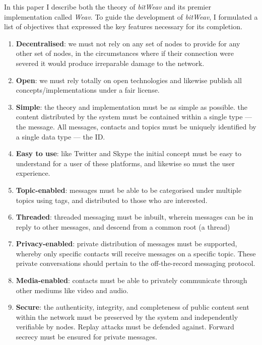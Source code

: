 \documentclass[10pt,a4paper,onecolumn]{article}
\begin{document}
In this paper I describe both the theory of \textit{bitWeav} and its premier implementation called \textit{Weav}. To guide the development of \textit{bitWeav}, I formulated a list of objectives that expressed the key features necessary for its completion.
\begin{enumerate}
\item \textbf{Decentralised}: we must not rely on any set of nodes to provide for any other set of nodes, in the circumstances where if their connection were severed it would produce irreparable damage to the network. 

\item \textbf{Open}: we must rely totally on open technologies and likewise publish all concepts/implementations under a fair license.

\item \textbf{Simple}: the theory and implementation must be as simple as possible. the content distributed by the system must be contained within a single type — the message. All messages, contacts and topics must be uniquely identified by a single data type — the ID.

\item \textbf{Easy to use}: like Twitter and Skype the initial concept must be easy to understand for a user of these platforms, and likewise so must the user experience.

\item \textbf{Topic-enabled}: messages must be able to be categorised under multiple topics using tags, and distributed to those who are interested.

\item \textbf{Threaded}: threaded messaging must be inbuilt, wherein messages can be in reply to other messages, and descend from a common root (a thread)

\item \textbf{Privacy-enabled}: private distribution of messages must be supported, whereby only specific contacts will receive messages on a specific topic. These private conversations should pertain to the off-the-record messaging protocol. 

\item \textbf{Media-enabled}: contacts must be able to privately communicate through other mediums like video and audio. 

\item \textbf{Secure}: the authenticity, integrity, and completeness of public content sent within the network must be preserved by the system and independently verifiable by nodes. Replay attacks must be defended against. Forward secrecy must be ensured for private messages.
\end{enumerate}
\end{document}
